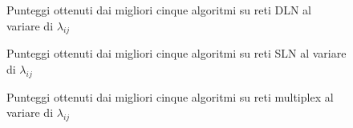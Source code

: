 \begin{figure}
    
    \centering
    \resizebox{\textwidth}{!}{}
    
    \caption{Punteggi ottenuti dai migliori cinque algoritmi su reti DLN al variare di $\lambda_{ij}$}
    \label{chart:dlnij}
\end{figure}


\begin{figure}
    
    \centering
    \resizebox{\textwidth}{!}{}
    
    \caption{Punteggi ottenuti dai migliori cinque algoritmi su reti SLN al variare di $\lambda_{ij}$}
    \label{chart:slnij}
\end{figure}

\begin{figure}
    
    \centering
    \resizebox{\textwidth}{!}{}

    \caption{Punteggi ottenuti dai migliori cinque algoritmi su reti multiplex al variare di $\lambda_{ij}$}
    \label{chart:muxij}
\end{figure}
